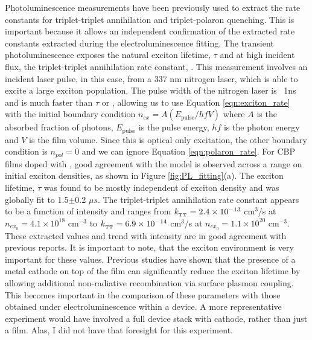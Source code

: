 \documentclass[../thesis.tex]{subfiles}
\begin{document}
Photoluminescence measurements have been previously used to extract the rate constants for triplet-triplet annihilation and triplet-polaron quenching.\supercite{Erickson2014,Reineke2007}
This is important because it allows an independent confirmation of the extracted rate constants extracted during the electroluminescence fitting.
The transient photoluminescence exposes the natural exciton lifetime, $\tau$ and at high incident flux, the triplet-triplet annihilation rate constant, \ktt.
This measurement involves an incident laser pulse, in this case, from a 337 nm nitrogen laser, which is able to excite a large exciton population.
The pulse width of the nitrogen laser is ~1ns and is much faster than $\tau$ or \ktt, allowing us to use Equation \ref{eqn:exciton_rate} with the initial boundary condition $n_{ex}=A(E_{\text{pulse}}/hfV)$ where $A$ is the absorbed fraction of photons, $E_{\text{pulse}}$ is the pulse energy, $hf$ is the photon energy and $V$ is the film volume.
Since this is optical only excitation, the other boundary condition is $n_{pol}=0$ and we can ignore Equation \ref{eqn:polaron_rate}.\supercite{Reineke2007,Erickson2014,Baldo2000a}
For CBP films doped with \irppy, good agreement with the model is observed across a range on initial exciton densities, as shown in Figure \ref{fig:PL_fitting}(a).
The exciton lifetime, $\tau$ was found to be mostly independent of exciton density and was globally fit to 1.5$\pm$0.2 $\mu s$.  
The triplet-triplet annihilation rate constant appears to be a function of intensity and ranges from $k_{_\text{\tiny TT}}=2.4\times10^{-13}$ cm$^3$/s at $n_{ex_0}=4.1\times10^{18}$ cm$^{-3}$ to $k_{_\text{\tiny TT}}=6.9\times10^{-14}$ cm$^3$/s at $n_{ex_0}=1.1\times10^{20}$ cm$^{-3}$.
These extracted values and trend with intensity are in good agreement with previous reports.\supercite{Reineke2007,Erickson2014,Staroske2007}
It is important to note, that the exciton environment is very important for these values.  
Previous studies have shown that the presence of a metal cathode on top of the film can significantly reduce the exciton lifetime by allowing additional non-radiative recombination via surface plasmon coupling.\supercite{Song2011}
This becomes important in the comparison of these parameters with those obtained under electroluminescence within a device.
A more representative experiment would have involved a full device stack with cathode, rather than just a film.  
Alas, I did not have that foresight for this experiment.
\end{document}
